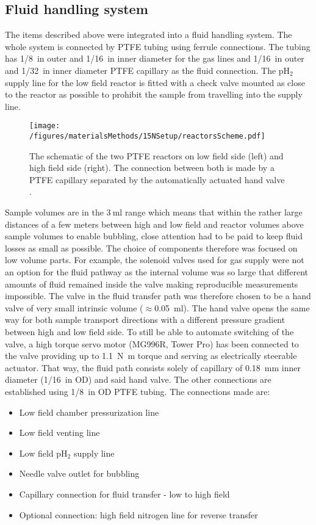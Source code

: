         \subsection{Fluid handling system}
        The items described above were integrated into a fluid handling system. The whole system is connected by PTFE tubing  using ferrule connections. The tubing has \SI{1/8}{in} outer and \SI{1/16}{in} inner diameter for the gas lines and \SI{1/16}{in} outer and \SI{1/32}{in} inner diameter PTFE capillary as the fluid connection. The pH$_2$ supply line for the low field reactor is fitted with a check valve mounted as close to the reactor as possible to prohibit the sample from travelling into the supply line.
            \begin{figure}
                \texttt{[image: /figures/materialsMethods/15NSetup/reactorsScheme.pdf]}
                \caption[Reactor schematics]{The schematic of the two PTFE reactors on low field side (left) and high field side (right). The connection between both is made by a PTFE capillary separated by the automatically actuated hand valve . }
                \label{fig:matMeth:shuttlingPathway}
            \end{figure}
            Sample volumes are in the $\SI{3}{\milli\litre}$ range which means that within the rather large distances of a few meters between high and low field and reactor volumes above sample volumes to enable bubbling, close attention had to be paid to keep fluid losses as small as possible.  The choice of components therefore was focused on low volume parts.  For example, the solenoid valves used for gas supply were not an option for the fluid pathway as the internal volume was so large that different amounts of fluid remained inside the valve making reproducible measurements impossible.  The valve in the fluid transfer path was therefore chosen to be a hand valve of very small intrinsic volume ($\approx$\SI{0.05}{\ml}). The hand valve opens the same way for both sample transport directions with a different pressure gradient between high and low field side. To still be able to automate switching of the valve, a high torque servo motor (MG996R, Tower Pro) has been connected to the valve providing up to \SI{1.1}{\newton\m} torque and serving as electrically steerable actuator. That way, the fluid path consists solely of capillary of \SI{0.18}{\mm} inner diameter (\SI{1/16}{in} OD) and said hand valve. The other connections are established using \SI{1/8}{in} OD PTFE tubing.  The connections made are:
            \begin{itemize}
                \setlength{\itemsep}{-2pt}
                \item Low field chamber pressurization line
                \item Low field venting line
                \item Low field pH$_2$ supply line
                \item Needle valve outlet for bubbling
                \item Capillary connection for fluid transfer - low to high field
                \item Optional connection: high field nitrogen line for reverse transfer
            \end{itemize}
